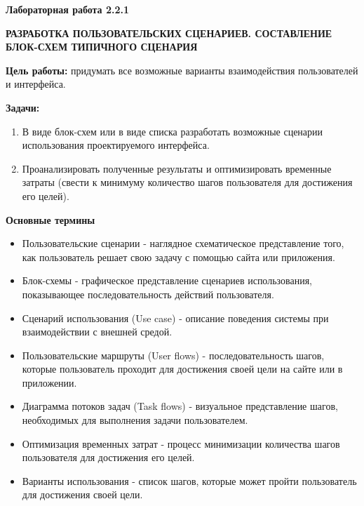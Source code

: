 
\graphicspath{ {2.2.1/models/} }

\pagestyle{fancy}
\fancyhead{}
\renewcommand{\headrulewidth}{0pt}


\begin{center}
    \textbf{Лабораторная работа 2.2.1}

    \textbf{РАЗРАБОТКА ПОЛЬЗОВАТЕЛЬСКИХ СЦЕНАРИЕВ. СОСТАВЛЕНИЕ БЛОК-СХЕМ ТИПИЧНОГО СЦЕНАРИЯ}
\end{center}

\textbf{Цель работы:} придумать все возможные варианты взаимодействия пользователей и интерфейса.
\bigskip

\textbf{Задачи:}

\begin{enumerate}
    \item В виде блок-схем или в виде списка разработать возможные сценарии использования проектируемого интерфейса.
    \item Проанализировать полученные результаты и оптимизировать временные затраты (свести к минимуму количество шагов пользователя для достижения его целей).

\end{enumerate}
\bigskip

\textbf{Основные термины}

\begin{itemize}
    \item Пользовательские сценарии - наглядное схематическое представление того, как пользователь решает свою задачу с помощью сайта или приложения.
    \item Блок-схемы - графическое представление сценариев использования, показывающее последовательность действий пользователя.
    \item Сценарий использования (Use case) - описание поведения системы при взаимодействии с внешней средой.
    \item Пользовательские маршруты (User flows) - последовательность шагов, которые пользователь проходит для достижения своей цели на сайте или в приложении.
    \item Диаграмма потоков задач (Task flows) - визуальное представление шагов, необходимых для выполнения задачи пользователем.
    \item Оптимизация временных затрат - процесс минимизации количества шагов пользователя для достижения его целей.
    \item Варианты использования - список шагов, которые может пройти пользователь для достижения своей цели.
\end{itemize}
\bigskip

